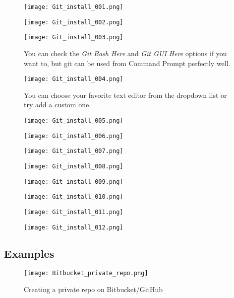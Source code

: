 \begin{appendices}
\begin{figure}[]
	\centering
	\texttt{[image: Git\_install\_001.png]}
\end{figure}
\begin{figure}[]
	\centering
	\texttt{[image: Git\_install\_002.png]}
\end{figure}
\begin{figure}[]
	\centering
	\texttt{[image: Git\_install\_003.png]}
	\caption{You can check the \textit{Git Bash Here} and \textit{Git GUI Here} options if you want to, but git can be used from Command Prompt perfectly well.}
\end{figure}
\begin{figure}[]
	\centering
	\texttt{[image: Git\_install\_004.png]}
	\caption{You can choose your favorite text editor from the dropdown list or try add a custom one.}
\end{figure}
\begin{figure}[]
	\centering
	\texttt{[image: Git\_install\_005.png]}
\end{figure}
\begin{figure}[]
	\centering
	\texttt{[image: Git\_install\_006.png]}
\end{figure}
\begin{figure}[]
	\centering
	\texttt{[image: Git\_install\_007.png]}
\end{figure}
\begin{figure}[]
	\centering
	\texttt{[image: Git\_install\_008.png]}
\end{figure}
\begin{figure}[]
	\centering
	\texttt{[image: Git\_install\_009.png]}
\end{figure}
\begin{figure}[]
	\centering
	\texttt{[image: Git\_install\_010.png]}
\end{figure}
\begin{figure}[]
	\centering
	\texttt{[image: Git\_install\_011.png]}
\end{figure}
\begin{figure}[]
	\centering
	\texttt{[image: Git\_install\_012.png]}
\end{figure}

\subsection{Examples}
\begin{figure}[htb]
	\centering
	\texttt{[image: Bitbucket\_private\_repo.png]}
	\caption{Creating a private repo on Bitbucket/GitHub}
\end{figure}


\end{appendices}
